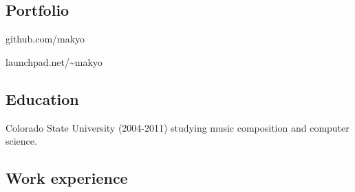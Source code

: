 \documentclass[letterpaper]{memoir}
\begin{document}
\subsection{Portfolio}

\noindent github.com/makyo

\noindent launchpad.net/\textasciitilde{}makyo

\subsection{Education}\label{education}

\begin{description}
\tightlist
\item[University] \hfill
Colorado State University (2004-2011) studying music composition and
computer science.
\end{description}

\newpage

\subsection{Work experience}
\end{document}
